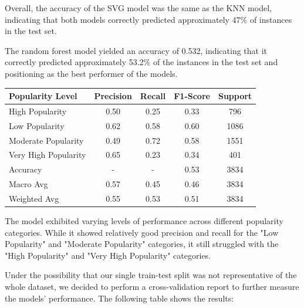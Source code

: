 \documentclass[11pt]{article} %
\begin{document}
Overall, the accuracy of the SVG model was the same as the KNN model, indicating that both models correctly predicted approximately 47\% of instances in the test set.

\newblock

The random forest model yielded an accuracy of 0.532, indicating that it correctly predicted approximately 53.2\% of the instances in the test set and positioning as the best performer of the models.

\begin{table}[H]
	\centering
	\begin{tabular}{lcccc}
		\toprule
		\textbf{Popularity Level} & \textbf{Precision} & \textbf{Recall} & \textbf{F1-Score} & \textbf{Support} \\
		\midrule
		\hline
		High Popularity           & 0.50               & 0.25            & 0.33              & 796              \\
		Low Popularity            & 0.62               & 0.58            & 0.60              & 1086             \\
		Moderate Popularity       & 0.49               & 0.72            & 0.58              & 1551             \\
		Very High Popularity      & 0.65               & 0.23            & 0.34              & 401              \\
		\hline
		Accuracy                  & -                  & -               & 0.53              & 3834             \\
		Macro Avg                 & 0.57               & 0.45            & 0.46              & 3834             \\
		Weighted Avg              & 0.55               & 0.53            & 0.51              & 3834             \\
		\bottomrule
	\end{tabular}
\end{table}

The model exhibited varying levels of performance across different popularity categories. While it showed relatively good precision and recall for the "Low Popularity" and "Moderate Popularity" categories, it still struggled with the "High Popularity" and "Very High Popularity" categories.

\newblock

Under the possibility that our single train-test split was not representative of the whole dataset, we decided to perform a cross-validation report to further measure the models' performance. The following table shows the results:
\end{document}
